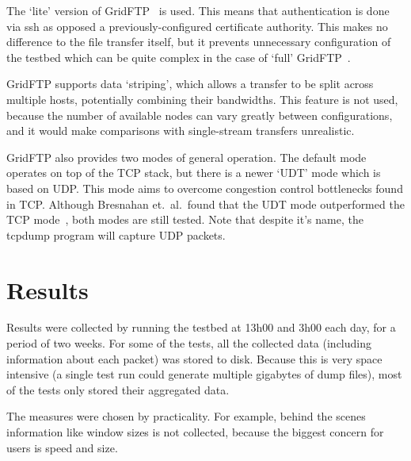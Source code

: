 \documentclass{sig-alternate-05-2015}
\begin{document}
The `lite' version of GridFTP~\cite{allcock2005globus} is used. This means that authentication is done via ssh as opposed a previously-configured certificate authority. This makes no difference to the file transfer itself, but it prevents unnecessary configuration of the testbed which can be quite complex in the case of `full' GridFTP~\cite{gridftplite}.

GridFTP supports data `striping', which allows a transfer to be split across multiple hosts, potentially combining their bandwidths. This feature is not used, because the number of available nodes can vary greatly between configurations, and it would make comparisons with single-stream transfers unrealistic.

GridFTP also provides two modes of general operation. The default mode operates on top of the TCP stack, but there is a newer `UDT' mode which is based on UDP\@. This mode aims to overcome congestion control bottlenecks found in TCP\@. Although Bresnahan et.\ al.\ found that the UDT mode outperformed the TCP mode~\cite{bresnahan2009udt}, both modes are still tested. Note that despite it's name, the tcpdump program will capture UDP packets.

\section{Results}
Results were collected by running the testbed at 13h00 and 3h00 each day, for a period of two weeks. For some of the tests, all the collected data (including information about each packet) was stored to disk. Because this is very space intensive (a single test run could generate multiple gigabytes of dump files), most of the tests only stored their aggregated data. 

The measures were chosen by practicality. For example, behind the scenes information like window sizes is not collected, because the biggest concern for users is speed and size.
\end{document}
